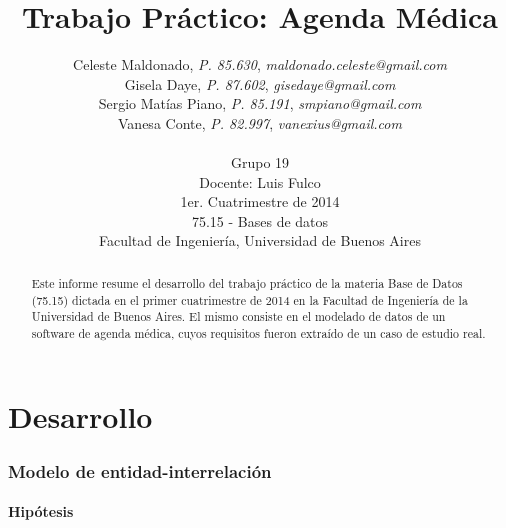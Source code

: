 \documentclass[a4paper,11pt]{article}
\title{\textbf{Trabajo Práctico: Agenda Médica}}
\author{
  Celeste Maldonado,	\textit{P. 85.630},	\textit{maldonado.celeste@gmail.com}	\\
  Gisela Daye,		\textit{P. 87.602},	\textit{gisedaye@gmail.com}		\\
  Sergio Matías Piano,	\textit{P. 85.191},	\textit{smpiano@gmail.com}		\\
  Vanesa Conte,		\textit{P. 82.997},	\textit{vanexius@gmail.com}		\\
  \\
  \normalsize{Grupo 19}							\\
  \normalsize{Docente: Luis Fulco}					\\
  \normalsize{1er. Cuatrimestre de 2014}                           	\\
  \normalsize{75.15 - Bases de datos}                              	\\
  \normalsize{Facultad de Ingeniería, Universidad de Buenos Aires}
}
\date{}
\begin{document}
\thispagestyle{empty}
\maketitle

\begin{abstract}

  Este informe resume el desarrollo del trabajo práctico de la materia Base
  de Datos (75.15) dictada en el primer cuatrimestre de 2014 en la Facultad de
  Ingeniería de la Universidad de Buenos Aires. El mismo consiste en el
  modelado de datos de un software de agenda médica,
  cuyos requisitos fueron extraído de un caso de estudio real.

\end{abstract}

\clearpage

\tableofcontents
\clearpage


\part{Desarrollo}


\section{Modelo de entidad-interrelación} \label{sec:der}

\subsection{Hipótesis}
\end{document}
